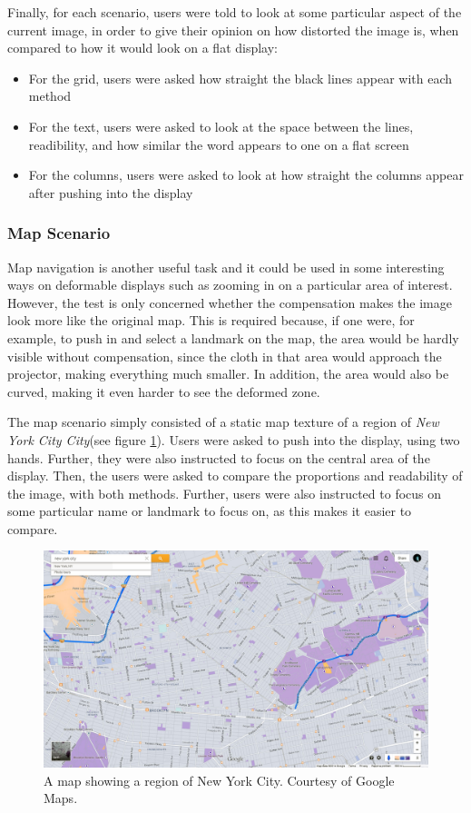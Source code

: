 \documentclass[]{article}
\begin{document}
Finally, for each scenario, users were told to look at some particular aspect of the current image, in order to give their opinion on how distorted the image is, when compared to how it would look on a flat display:
\begin{itemize}
\item For the grid, users were asked how straight the black lines appear with each method
\item For the text, users were asked to look at the space between the lines, readibility, and how similar the word appears to one on a flat screen
\item For the columns, users were asked to look at how straight the columns appear after pushing into the display
\end{itemize}

\subsubsection{Map Scenario}

Map navigation is another useful task and it could be used in some interesting ways on deformable displays such as zooming in on a particular area of interest. However, the test is only concerned whether the compensation makes the image look more like the original map.  This is required because, if one were, for example, to push in and select a landmark on the map, the area would be hardly visible without compensation, since the cloth in that area would approach the projector, making everything much smaller. In addition, the area would also be curved, making it even harder to see the deformed zone.

The map scenario simply consisted of a static map texture of a region of \textit{New York City City}(see figure \ref{fig:Map}). Users were asked to push into the display, using two hands. Further, they were also instructed to focus on the central area of the display. Then, the users were asked to compare the proportions and readability of the image, with both methods. Further, users were also instructed to focus on some particular name or landmark to focus on, as this makes it easier to compare.


\begin{figure}[!hbtp]
    \centering
    \includegraphics[width=1.0\textwidth]{figures/NYMidZoomA.jpg}
    \caption{A map showing a region of New York City. Courtesy of Google Maps.}
    \label{fig:Map}
\end{figure}
\end{document}
